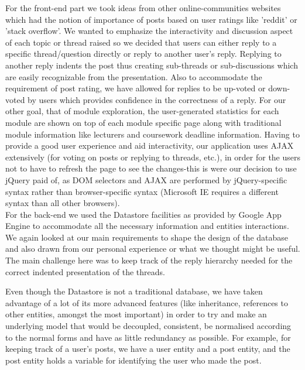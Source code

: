 \documentclass[12pt,a4paper,titlepage]{article}
\begin{document}
For the front-end part we took ideas from other online-communities websites which had the notion of importance of posts based on user ratings like 'reddit' or 'stack overflow'.  We wanted to emphasize the interactivity and discussion aspect of each topic or thread raised so we decided that users can either reply to a specific thread/question directly or reply to another user's reply. Replying to another reply indents the post thus creating sub-threads or sub-discussions which are easily recognizable from the presentation. Also to accommodate the requirement of post rating, we have allowed for replies to be up-voted or down-voted by users which provides confidence in the correctness of a reply. For our other goal, that of module exploration, the user-generated statistics for each module are shown on top of each module specific page along with traditional module information like lecturers and coursework deadline information. Having to provide a good user experience and aid interactivity, our application uses AJAX extensively (for voting on posts or replying to threads, etc.), in order for the users not to have to refresh the page to see the changes-this is were our decision to use jQuery paid of, as DOM selectors and AJAX are performed by jQuery-specific syntax rather than browser-specific syntax (Microsoft IE requires a different syntax than all other browsers).\\

For the back-end we used the Datastore facilities as provided by Google App Engine to accommodate all the necessary information and entities interactions. We again looked at our main requirements to shape the design of the database and also drawn from our personal experience or what we thought might be useful. The main challenge here was to keep track of the reply hierarchy needed for the correct indented presentation of the threads. 

Even though the Datastore is not a traditional database, we have taken advantage of a lot of its more advanced features (like inheritance, references to other entities, amongst the most important) in order to try and make an underlying model that would be decoupled, consistent, be normalised according to the normal forms and have as little redundancy as possible. For example, for keeping track of a user's posts, we have a user entity and a post entity, and the post entity holds a variable for  identifying the user who made the post.
\newpage
\end{document}
